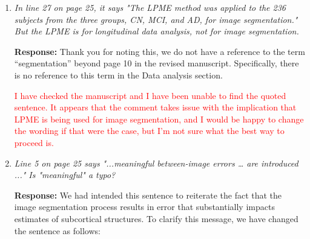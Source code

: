 \documentclass[12pt]{article}
\theoremstyle{definition}
\newcommand{\revision}[1]{\textcolor{blue}{#1}}
\newcommand{\question}[1]{\textcolor{red}{#1}}
\begin{document}
\begin{enumerate}
\revision{This analysis focuses on 1467 participants from the ADNI-1, ADNI-2, and ADNI-3 cohorts for whom T1-weighted MP-RAGE images were available through the study's online repository, located at located at \href{https://ida.loni.usc.edu/login.jsp?project=ADNI}{\texttt{https://ida.loni.usc.edu/login.jsp?project=ADNI}}}. Of these participants, \revision{435} were cognitively normal, \revision{741} displayed symptoms of mild cognitive impairment, and \revision{271} were diagnosed with AD at the baseline study visit. Diagnostic information was unavailable for \revision{20} of the \revision{1467} participants for whom imaging data was available. Of the \revision{435} cognitively normal participants, \revision{108} were subsequently diagnosed with mild cognitive impairment or dementia during the course of the study. Follow-up duration for these participants ranged from 0 months to approximately \revision{124} months, with imaging scheduled to be conducted at six- or 12-month intervals depending on the stage of the study. To encourage greater stability of longitudinal estimates, only participants with at least 24 months of follow-up were considered. Our final analysis set included \revision{909} participants. Of these remaining participants, \revision{328} were cognitively normal, \revision{477} had mild cognitive impairment, and \revision{104} were diagnosed with AD at their baseline visits.


\item \textit{In line 27 on page 25, it says "The LPME method was applied to the 236 subjects from the three groups, CN, MCI, and AD, for image segmentation." But the LPME is for longitudinal data analysis, not for image segmentation.}

{\bf Response:} Thank you for noting this, we do not have a reference to the term ``segmentation'' beyond page 10 in the revised manuscript. Specifically, there is no reference to this term in the Data analysis section. 

\question{I have checked the manuscript and I have been unable to find the quoted sentence. It appears that the comment takes issue with the implication that LPME is being used for image segmentation, and I would be happy to change the wording if that were the case, but I'm not sure what the best way to proceed is.}

\item \textit{Line 5 on page 25 says "...meaningful between-image errors … are introduced ..." Is "meaningful" a typo?}

{\bf Response:} We had intended this sentence to reiterate the fact that the image segmentation process results in error that substantially impacts estimates of subcortical structures. To clarify this message, we have changed the sentence as follows:


\end{enumerate}
\end{document}

